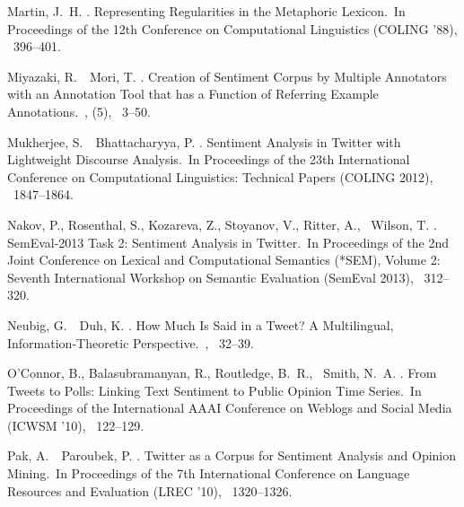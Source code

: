 \documentclass[english]{jnlp_1.4}
\begin{document}
\begin{thebibliography}{}
Martin, J.~H. \BBCP.
\newblock \BBOQ Representing Regularities in the Metaphoric Lexicon.\BBCQ\
\newblock In {\Bem Proceedings of the 12th Conference on Computational
  Linguistics (COLING '88)}, \mbox{\BPGS\ 396--401}.

Miyazaki, R.\BBACOMMA\ \BBA\ Mori, T. \BBOP 2010\BBCP.
\newblock \BBOQ Creation of Sentiment Corpus by Multiple Annotators with an
  Annotation Tool that has a Function of Referring Example Annotations.\BBCQ\
, {}  (5),
  \mbox{\BPGS\ 3--50}.

Mukherjee, S.\BBACOMMA\ \BBA\ Bhattacharyya, P. \BBCP.
\newblock \BBOQ Sentiment Analysis in Twitter with Lightweight Discourse
  Analysis.\BBCQ\
\newblock In {\Bem Proceedings of the 23th International Conference on
  Computational Linguistics: Technical Papers (COLING 2012)}, \mbox{\BPGS\
  1847--1864}.

Nakov, P., Rosenthal, S., Kozareva, Z., Stoyanov, V., Ritter, A., \BBA\ Wilson,
  T. \BBCP.
\newblock \BBOQ SemEval-2013 Task 2: Sentiment Analysis in Twitter.\BBCQ\
\newblock In {\Bem Proceedings of the 2nd Joint Conference on Lexical and
  Computational Semantics (*SEM), Volume 2: Seventh International Workshop on
  Semantic Evaluation (SemEval 2013)}, \mbox{\BPGS\ 312--320}.

Neubig, G.\BBACOMMA\ \BBA\ Duh, K. \BBOP 2013\BBCP.
\newblock \BBOQ How Much Is Said in a Tweet? A Multilingual,
  Information-Theoretic Perspective.\BBCQ\
, \mbox{\BPGS\ 32--39}.

O'Connor, B., Balasubramanyan, R., Routledge, B.~R., \BBA\ Smith, N.~A. \BBCP.
\newblock \BBOQ From Tweets to Polls: Linking Text Sentiment to Public Opinion
  Time Series.\BBCQ\
\newblock In {\Bem Proceedings of the International AAAI Conference on Weblogs
  and Social Media (ICWSM '10)}, \mbox{\BPGS\ 122--129}.

Pak, A.\BBACOMMA\ \BBA\ Paroubek, P. \BBCP.
\newblock \BBOQ Twitter as a Corpus for Sentiment Analysis and Opinion
  Mining.\BBCQ\
\newblock In {\Bem Proceedings of the 7th International Conference on Language
  Resources and Evaluation (LREC '10)}, \mbox{\BPGS\ 1320--1326}.


\end{thebibliography}
\end{document}
